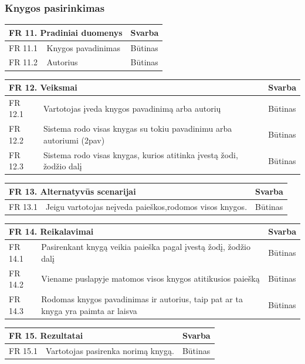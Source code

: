 \documentclass{VUMIFPSkursinis}
\begin{document}
\subsubsection{Knygos pasirinkimas}

\noindent
 \vspace{5mm}
 \begin{tabular}{ | p{} | p{} | p{} |}
    \hline
    \multicolumn{2}{|l|}{ FR 11. Pradiniai duomenys} &Svarba  \\ \hline 
  FR 11.1& Knygos pavadinimas&  Būtinas\\ \hline
  FR 11.2& Autorius&  Būtinas\\ \hline
  \end{tabular}
    \vspace{5mm}   
 \begin{tabular}{ | p{} | p{} | p{} |}
    \hline
        \multicolumn{2}{|l|}{  FR 12. Veiksmai} &Svarba  \\ \hline 
 FR 12.1&Vartotojas įveda knygos pavadinimą arba autorių&  Būtinas\\ \hline
  FR 12.2& Sistema rodo visas knygas su tokiu pavadinimu arba autoriumi (2pav)&  Būtinas\\ \hline
 FR 12.3 &Sistema rodo visas knygas, kurios atitinka įvestą žodi, žodžio dalį&  Būtinas\\ \hline
    \end{tabular}
    \vspace{5mm}  
 \begin{tabular}{ | p{} | p{} | p{} |}
    \hline
   \multicolumn{2}{|l|}{  FR 13. Alternatyvūs scenarijai} &Svarba  \\ \hline 
  FR 13.1& Jeigu vartotojas neįveda paieškos,rodomos visos knygos.&  Būtinas\\ \hline
    \end{tabular}
 \vspace{5mm}
    \begin{tabular}{ | p{} | p{} | p{} |}
    \hline
     \multicolumn{2}{|l|}{   FR 14. Reikalavimai} &Svarba  \\ \hline 
  FR 14.1 & Pasirenkant knygą veikia paieška pagal įvestą žodį, žodžio dalį &Būtinas\\ \hline
    FR 14.2 & Viename puslapyje matomos visos knygos atitikusios paiešką  &Būtinas\\ \hline
     FR 14.3 & Rodomas knygos pavadinimas ir autorius, taip pat ar ta knyga yra paimta ar laisva &Būtinas \\ \hline
    \end{tabular}
    \vspace{5mm}
     \begin{tabular}{ | p{} | p{} | p{} |}
    \hline
     \multicolumn{2}{|l|}{ FR 15. Rezultatai } &Svarba  \\ \hline 
  FR 15.1 & Vartotojas pasirenka norimą knygą.& Būtinas\\ \hline

    \end{tabular}
\end{document}
